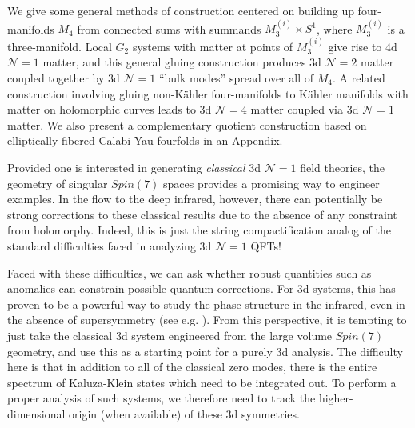 \documentclass[12pt]{article}%
\numberwithin{equation}{section}
\renewcommand{\(}{\left(}
\renewcommand{\)}{\right)}
\renewcommand{\[}{\left[}
\renewcommand{\]}{\right]}
\begin{document}
We give some general methods of construction centered on building up four-manifolds $M_4$ from connected sums with summands $M^{(i)}_3 \times S^1$, where $M^{(i)}_3$ is a three-manifold. Local $G_2$ systems with matter at points of $M^{(i)}_{3}$ give rise to 4d $\mathcal{N} = 1$ matter, and this general gluing construction produces 3d $\mathcal{N} = 2$ matter coupled together by 3d $\mathcal{N} = 1$ ``bulk modes'' spread over all of $M_4$. A related construction involving gluing non-K\"ahler four-manifolds to K\"ahler manifolds with matter on holomorphic curves leads to 3d $\mathcal{N} = 4$ matter coupled via 3d $\mathcal{N} = 1$ matter. We also present a complementary quotient construction based on elliptically fibered Calabi-Yau fourfolds in an Appendix.


Provided one is interested in generating \textit{classical} 3d $\mathcal{N} = 1$ field theories, the geometry of
singular $Spin(7)$ spaces provides a promising way to engineer examples. In the flow to the deep infrared, however,
there can potentially be strong corrections to these classical results due to the absence of any constraint from holomorphy.
Indeed, this is just the string compactification analog of the standard difficulties faced in analyzing
3d $\mathcal{N} = 1$ QFTs!

Faced with these difficulties, we can ask whether robust quantities such as anomalies can constrain
possible quantum corrections. For 3d systems, this has proven to be a powerful way to study the phase structure
in the infrared, even in the absence of supersymmetry (see e.g. \cite{Aharony:2015mjs, Cordova:2017kue}).
From this perspective, it is tempting to just take the classical 3d system engineered from the large volume $Spin(7)$ geometry, and use this as a starting point for a purely 3d analysis. The difficulty here is that in addition to all of the classical zero modes, there is the entire spectrum of Kaluza-Klein states which need to be integrated out. To perform a proper analysis of such systems, we therefore need to track the higher-dimensional origin (when available) of these 3d symmetries.
\end{document}
